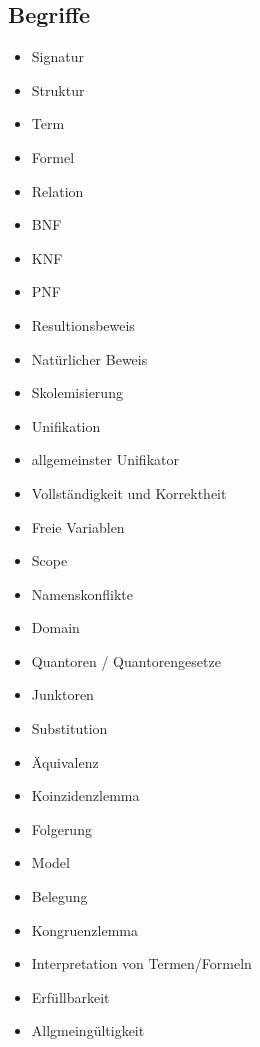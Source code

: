 \documentclass{article}
\begin{document}
    \subsection{Begriffe}
    \begin{multicols}{2}
        \begin{itemize}
            \item Signatur
            \item Struktur
            \item Term
            \item Formel
            \item Relation
            \item BNF
            \item KNF
            \item PNF
            \item Resultionsbeweis
            \item Natürlicher Beweis
            \item Skolemisierung
            \item Unifikation
            \item allgemeinster Unifikator
            \item Vollständigkeit und Korrektheit
            \item Freie Variablen
            \item Scope
            \item Namenskonflikte
            \item Domain
            \item Quantoren / Quantorengesetze
            \item Junktoren
            \item Substitution
            \item Äquivalenz
            \item Koinzidenzlemma
            \item Folgerung
            \item Model
            \item Belegung
            \item Kongruenzlemma
            \item Interpretation von Termen/Formeln
            \item Erfüllbarkeit
            \item Allgmeingültigkeit
        \end{itemize}
    \end{multicols}
    
\end{document}
